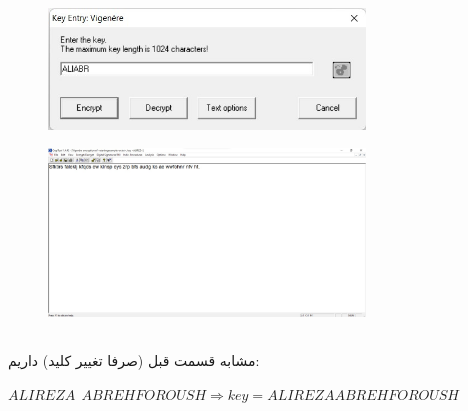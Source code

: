 \documentclass{article}
\begin{document}
\begin{figure}[H]
    \centering
    \includegraphics[width=0.75\textwidth]{figures/3ab.jpg}
    \caption
	{}
    \label{fig:fig1}
\end{figure}

\begin{figure}[H]
    \centering
    \includegraphics[width=0.75\textwidth]{figures/3ac.jpg}
    \caption
	{}
    \label{fig:fig1}
\end{figure}

\subsection{}
مشابه قسمت قبل (صرفا تغییر کلید) داریم:
\begin{latin}
$
ALIREZA\:\:ABREHFOROUSH \Rightarrow key = ALIREZAABREHFOROUSH
$
\end{latin}
\end{document}
